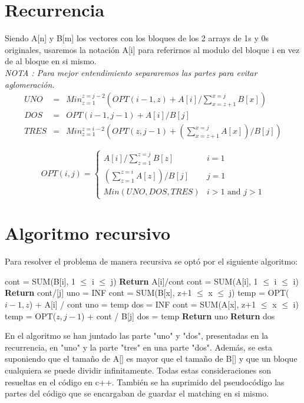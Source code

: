 \documentclass[12pt]{article}
\newcommand{\TITLE}[1]{\item[#1]}
\newcommand{\algcost}[2]{\strut\hfill\makebox[1.5cm][l]{#1}\makebox[4cm][l]{#2}}
\begin{document}
\section{Recurrencia}
Siendo A[n] y B[m] los vectores con los bloques de los 2 arrays de 1s y 0s originales, usaremos la notación A[i] para referirnos al modulo del bloque i en vez de al bloque en si mismo.\\
\textit{NOTA : Para mejor entendimiento separaremos las partes para evitar aglomeración.}\\
\begin{eqnarray*}
UNO&=& Min_{z=1}^{z=j-2}(OPT(i-1,z) + A[i]/\sum_{x=z+1}^{x=j}B[x]) \\
DOS&=& OPT(i-1,j-1) + A[i]/B[j] \\
TRES&=& Min_{z=1}^{z=i-2}(OPT(z,j-1) + (\sum_{x=z+1}^{x=j}A[x])/B[j] )
\end{eqnarray*}

\begin{equation*}
OPT(i,j) =
\begin{cases}
A[i]/\sum_{z=1}^{z=j}B[z] & i = 1\\
(\sum_{z=1}^{z=i}A[z])/B[j] & j=1\\
Min(UNO,DOS,TRES) & i>1 \text{ and } j>1

\end{cases}
\end{equation*}

\section{Algoritmo recursivo}
Para resolver el problema de manera recursiva se optó por el siguiente algoritmo:\\
\begin{algorithmic}[1]
\TITLE{\textsc{opt}$(i ,j)$}
    \IF{i = 0  \algcost{$.$}{$.$}}
        \STATE cont = SUM(B[i], 1 $\leq$ i $\leq$ j)
        \STATE \textbf{Return} A[i]/cont
    \ENDIF
        \STATE cont = SUM(A[i], 1 $\leq$ i $\leq$ i)
        \STATE \textbf{Return} cont/[j]
    \ENDIF
    \STATE uno  = INF
        \STATE cont = SUM(B[x], z+1 $\leq$ x $\leq$ j)
        \STATE temp = OPT($i-1,z$) + A[i] / cont
            \STATE uno = temp
        \ENDIF
    \ENDFOR
    \STATE dos = INF
        \STATE cont = SUM(A[x], z+1 $\leq$ x $\leq$ i)
        \STATE temp = OPT($z,j-1$) + cont / B[j]
            \STATE dos = temp
        \ENDIF
    \ENDFOR
        \STATE \textbf{Return} uno
    \ENDIF
    \STATE \textbf{Return} dos
\end{algorithmic}
En el algoritmo se han juntado las parte "uno" y "dos", presentadas en la recurrencia, en "uno" y la parte "tres" en una parte "dos". Además, se esta suponiendo que el tamaño de A[] es mayor que el tamaño de B[] y que un bloque cualquiera se puede dividir infinitamente. Todas estas consideraciones son resueltas en el código en c++. También se ha suprimido del pseudocódigo las partes del código que se encargaban de guardar el matching en si mismo.
\end{document}
